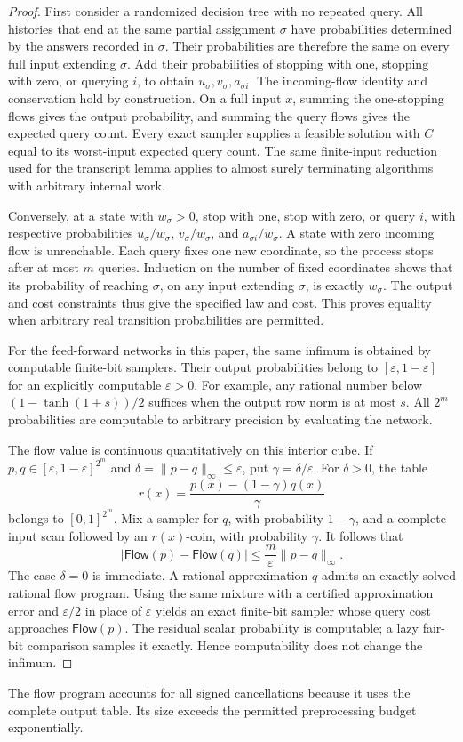 \begin{proof}
First consider a randomized decision tree with no repeated query.
All histories that end at the same partial assignment \(\sigma\)
have probabilities determined by the answers recorded in \(\sigma\).
Their probabilities are therefore the same on every full input
extending \(\sigma\).  Add their probabilities of stopping with
one, stopping with zero, or querying \(i\), to obtain
\(u_\sigma,v_\sigma,a_{\sigma i}\).
The incoming-flow identity and conservation hold by construction.
On a full input \(x\), summing the one-stopping flows gives the
output probability, and summing the query flows gives the expected
query count.  Every exact sampler supplies a feasible solution with
\(C\) equal to its worst-input expected query count.  The same
finite-input reduction used for the transcript lemma applies to
almost surely terminating algorithms with arbitrary internal work.

Conversely, at a state with \(w_\sigma>0\), stop with one, stop
with zero, or query \(i\), with respective probabilities
\(u_\sigma/w_\sigma\), \(v_\sigma/w_\sigma\), and
\(a_{\sigma i}/w_\sigma\).  A state with zero incoming flow is
unreachable.  Each query fixes one new coordinate, so the process
stops after at most \(m\) queries.  Induction on the number of
fixed coordinates shows that its probability of reaching
\(\sigma\), on any input extending \(\sigma\), is exactly
\(w_\sigma\).  The output and cost constraints thus give the
specified law and cost.  This proves equality when arbitrary
real transition probabilities are permitted.

For the feed-forward networks in this paper, the same infimum is obtained by
computable finite-bit samplers.  Their output probabilities belong
to \([\varepsilon,1-\varepsilon]\) for an explicitly computable
\(\varepsilon>0\).  For example, any rational number below
\((1-\tanh(1+s))/2\) suffices when the output row norm is at
most \(s\).  All \(2^m\) probabilities are computable to
arbitrary precision by evaluating the network.

The flow value is continuous quantitatively on this interior cube.
If \(p,q\in[\varepsilon,1-\varepsilon]^{2^m}\) and
\(\delta=\|p-q\|_\infty\le\varepsilon\), put
\(\gamma=\delta/\varepsilon\).  For \(\delta>0\), the table
\[
 r(x)=\frac{p(x)-(1-\gamma)q(x)}{\gamma}
\]
belongs to \([0,1]^{2^m}\).  Mix a sampler for \(q\), with
probability \(1-\gamma\), and a complete input scan followed by
an \(r(x)\)-coin, with probability \(\gamma\).  It follows that
\[
 |\mathsf{Flow}(p)-\mathsf{Flow}(q)|
 \le\frac{m}{\varepsilon}\|p-q\|_\infty.
\]
The case \(\delta=0\) is immediate.  A rational approximation
\(q\) admits an exactly solved rational flow program.  Using the
same mixture with a certified approximation error and
\(\varepsilon/2\) in place of \(\varepsilon\) yields an exact
finite-bit sampler whose query cost approaches
\(\mathsf{Flow}(p)\).  The residual scalar probability is
computable; a lazy fair-bit comparison samples it exactly.  Hence
computability does not change the infimum.
\end{proof}

The flow program accounts for all signed cancellations because it
uses the complete output table.  Its size exceeds the permitted
preprocessing budget exponentially.
